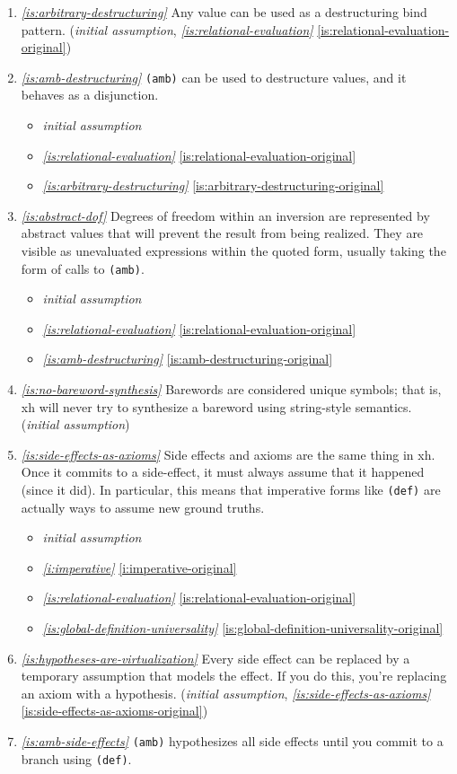 \documentclass{report}
\makeatletter
\newcommand*{\Label}[2]{%
  \@bsphack
  \begingroup
    \label{#1-original}%
    \def\@currentlabel{#2}%
    \label{#1}%
  \endgroup
  \@esphack
}
\newcommand{\initial}{{\em initial assumption}}
\newcommand{\refboth}[1]{{\em \ref{#1}} \ref{#1-original}}
\makeatother
\begin{document}
\begin{enumerate}
\item{}\Label{is:arbitrary-destructuring}{xhs.destructuring}{\em\ref{is:arbitrary-destructuring}}
  Any value can be used as a destructuring bind pattern.
(\initial, \refboth{is:relational-evaluation})
\item{}\Label{is:amb-destructuring}{xhs.ambdestructure}{\em\ref{is:amb-destructuring}}
  \verb|(amb)| can be used to destructure values, and it behaves as a
  disjunction.
\begin{itemize}
\item \initial
\item \refboth{is:relational-evaluation}
\item \refboth{is:arbitrary-destructuring}
\end{itemize}
\item{}\Label{is:abstract-dof}{xhs.dof}{\em\ref{is:abstract-dof}}
  Degrees of freedom within an inversion are represented by abstract values
  that will prevent the result from being realized. They are visible as
  unevaluated expressions within the quoted form, usually taking the form
  of calls to \verb|(amb)|.
\begin{itemize}
\item \initial
\item \refboth{is:relational-evaluation}
\item \refboth{is:amb-destructuring}
\end{itemize}
\item{}\Label{is:no-bareword-synthesis}{xhs.nosynbareword}{\em\ref{is:no-bareword-synthesis}}
  Barewords are considered unique symbols; that is, xh will never try to
  synthesize a bareword using string-style semantics.
(\initial)

\item{}\Label{is:side-effects-as-axioms}{xhs.se-axioms}{\em\ref{is:side-effects-as-axioms}}
  Side effects and axioms are the same thing in xh. Once it commits to a
  side-effect, it must always assume that it happened (since it did). In
  particular, this means that imperative forms like {\tt (def)} are
  actually ways to assume new ground truths.
\begin{itemize}
\item \initial
\item \refboth{i:imperative}
\item \refboth{is:relational-evaluation}
\item \refboth{is:global-definition-universality}
\end{itemize}
\item{}\Label{is:hypotheses-are-virtualization}{xhs.virtualization}{\em\ref{is:hypotheses-are-virtualization}}
  Every side effect can be replaced by a temporary assumption that models
  the effect. If you do this, you're replacing an axiom with a hypothesis.
(\initial, \refboth{is:side-effects-as-axioms})
\item{}\Label{is:amb-side-effects}{xhs.amb-se}{\em\ref{is:amb-side-effects}}
  \verb|(amb)| hypothesizes all side effects until you commit to a branch
  using \verb|(def)|.


\end{enumerate}
\end{document}
